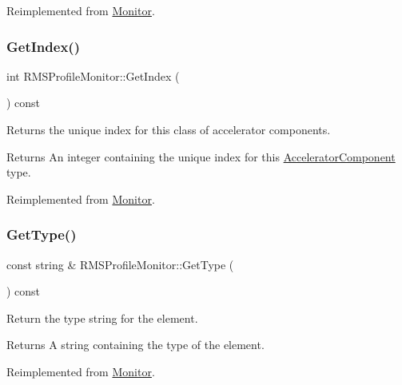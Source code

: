 Reimplemented from \hyperlink{classMonitor_a66d7932308a7206eeefc552bd3f5b1f6}{Monitor}.

\mbox{\label{classRMSProfileMonitor_a87a98fa994d96c393a91500320242942}} 
\subsubsection{\texorpdfstring{Get\+Index()}{GetIndex()}}
{\footnotesize\ttfamily int R\+M\+S\+Profile\+Monitor\+::\+Get\+Index (\begin{DoxyParamCaption}{ }\end{DoxyParamCaption}) const\hspace{0.3cm}{\ttfamily [virtual]}}

Returns the unique index for this class of accelerator components. \begin{DoxyReturn}{Returns}
An integer containing the unique index for this \hyperlink{classAcceleratorComponent}{Accelerator\+Component} type. 
\end{DoxyReturn}


Reimplemented from \hyperlink{classMonitor_a38297eb50d06dd56201f2b48d92aa789}{Monitor}.

\mbox{\label{classRMSProfileMonitor_ab97d742126deccadd878c402291a6263}} 
\subsubsection{\texorpdfstring{Get\+Type()}{GetType()}}
{\footnotesize\ttfamily const string \& R\+M\+S\+Profile\+Monitor\+::\+Get\+Type (\begin{DoxyParamCaption}{ }\end{DoxyParamCaption}) const\hspace{0.3cm}{\ttfamily [virtual]}}

Return the type string for the element. \begin{DoxyReturn}{Returns}
A string containing the type of the element. 
\end{DoxyReturn}


Reimplemented from \hyperlink{classMonitor_a8408f173bef0f0c0dd89b6624c84f66b}{Monitor}.

